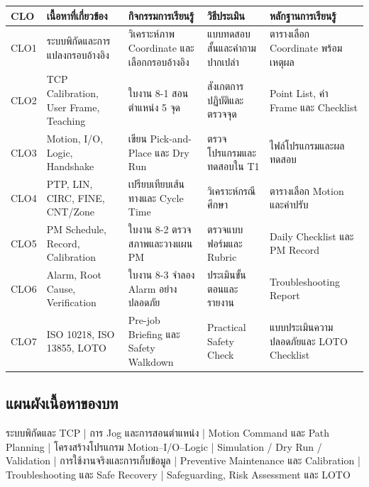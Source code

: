 \begin{table}[htbp]
    \centering
    \small
    \begin{tabularx}{\textwidth}{@{}L{0.08\textwidth}L{0.24\textwidth}L{0.24\textwidth}L{0.18\textwidth}Y@{}}
        \hline
        \textbf{CLO} & \textbf{เนื้อหาที่เกี่ยวข้อง} & \textbf{กิจกรรมการเรียนรู้} & \textbf{วิธีประเมิน} & \textbf{หลักฐานการเรียนรู้} \\
        \hline
        CLO1 & ระบบพิกัดและการแปลงกรอบอ้างอิง & วิเคราะห์ภาพ Coordinate และเลือกกรอบอ้างอิง & แบบทดสอบสั้นและคำถามปากเปล่า & ตารางเลือก Coordinate พร้อมเหตุผล \\
        CLO2 & TCP Calibration, User Frame, Teaching & ใบงาน 8-1 สอนตำแหน่ง 5 จุด & สังเกตการปฏิบัติและตรวจจุด & Point List, ค่า Frame และ Checklist \\
        CLO3 & Motion, I/O, Logic, Handshake & เขียน Pick-and-Place และ Dry Run & ตรวจโปรแกรมและทดสอบใน T1 & ไฟล์โปรแกรมและผลทดสอบ \\
        CLO4 & PTP, LIN, CIRC, FINE, CNT/Zone & เปรียบเทียบเส้นทางและ Cycle Time & วิเคราะห์กรณีศึกษา & ตารางเลือก Motion และค่าปรับ \\
        CLO5 & PM Schedule, Record, Calibration & ใบงาน 8-2 ตรวจสภาพและวางแผน PM & ตรวจแบบฟอร์มและ Rubric & Daily Checklist และ PM Record \\
        CLO6 & Alarm, Root Cause, Verification & ใบงาน 8-3 จำลอง Alarm อย่างปลอดภัย & ประเมินขั้นตอนและรายงาน & Troubleshooting Report \\
        CLO7 & ISO 10218, ISO 13855, LOTO & Pre-job Briefing และ Safety Walkdown & Practical Safety Check & แบบประเมินความปลอดภัยและ LOTO Checklist \\
        \hline
    \end{tabularx}
\end{table}

\subsection{แผนผังเนื้อหาของบท}

\begin{center}
ระบบพิกัดและ TCP
        |
การ Jog และการสอนตำแหน่ง
        |
Motion Command และ Path Planning
        |
โครงสร้างโปรแกรม Motion–I/O–Logic
        |
Simulation / Dry Run / Validation
        |
การใช้งานจริงและการเก็บข้อมูล
        |
Preventive Maintenance และ Calibration
        |
Troubleshooting และ Safe Recovery
        |
Safeguarding, Risk Assessment และ LOTO
\end{center}

